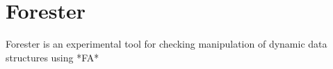 \section {Forester}

Forester is an experimental tool for checking manipulation of dynamic data
structures using *\gls{FA}*
